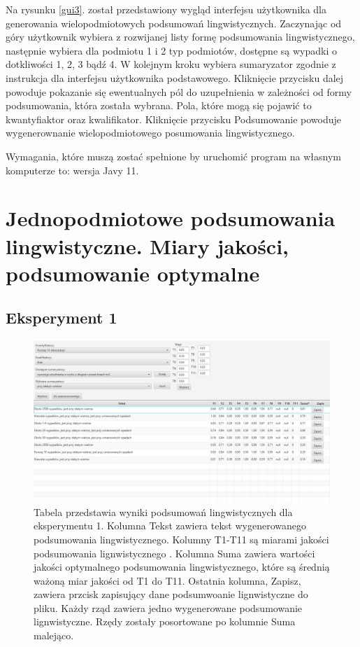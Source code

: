 \documentclass{classrep}
\begin{document}
\newpage

Na rysunku \ref{gui3}. został przedstawiony wygląd interfejsu użytkownika dla generowania wielopodmiotowych podsumowań lingwistycznych. Zaczynając od góry użytkownik wybiera z rozwijanej listy formę podsumowania lingwistycznego, następnie wybiera dla podmiotu 1 i 2 typ podmiotów, dostępne są wypadki o dotkliwości 1, 2, 3 bądź 4. W kolejnym kroku wybiera sumaryzator zgodnie z instrukcja dla interfejsu użytkownika podstawowego. Kliknięcie przycisku dalej powoduje pokazanie się ewentualnych pól do uzupełnienia w zależności od formy podsumowania, która została wybrana. Pola, które mogą się pojawić to kwantyfiaktor oraz kwalifikator. Kliknięcie przycisku Podsumowanie powoduje wygenerownanie wielopodmiotowego posumowania lingwistycznego. 


Wymagania, które muszą zostać spełnione by uruchomić program na własnym komputerze to: wersja Javy 11. 

\newpage




\section{ Jednopodmiotowe podsumowania lingwistyczne. Miary jakości, podsumowanie optymalne}
\label{section:ex}
\subsection{Eksperyment 1}
\label{section:ex1}
\begin{figure}[h!]
 \centering
 \includegraphics[width=15cm]{ex1.png}
 \vspace{-0.3cm}
 \caption{Tabela przedstawia wyniki podsumowań lingwistycznych dla eksperymentu 1. Kolumna Tekst zawiera tekst wygenerowanego podsumowania lingwistycznego. Kolumny T1-T11 są miarami jakości podsumowania lignwistycznego \cite{niewiadomski19}. Kolumna Suma zawiera wartości jakości optymalnego podsumowania lingwistycznego, które są średnią ważoną miar jakości od T1 do T11. Ostatnia kolumna, Zapisz, zawiera przcisk zapisujący dane podsumwoanie lignwistyczne do pliku. Każdy rząd zawiera jedno wygenerowane podsumowanie lignwistyczne. Rzędy zostały posortowane po kolumnie Suma malejąco.  }
 \label{ex1}
\end{figure}
\end{document}
